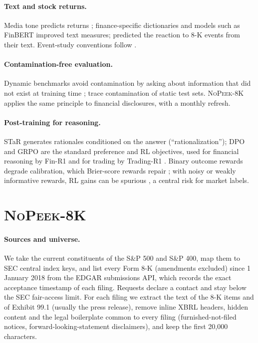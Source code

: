 \documentclass{article}
\newcommand{\dataset}{\textsc{NoPeek-8K}}
\begin{document}
\paragraph{Text and stock returns.}
Media tone predicts returns \citep{tetlock2007giving}; finance-specific dictionaries \citep{loughran2011liability} and
models such as FinBERT \citep{araci2019finbert} improved text measures; \citet{lee2014importance} predicted the
reaction to 8-K events from their text. Event-study conventions follow \citet{mackinlay1997event}.

\paragraph{Contamination-free evaluation.}
Dynamic benchmarks avoid contamination by asking about information that did not exist at training time
\citep{white2024livebench,karger2025forecastbench}; \citet{golchin2024time} trace contamination of static test sets.
\dataset{} applies the same principle to financial disclosures, with a monthly refresh.

\paragraph{Post-training for reasoning.}
STaR \citep{zelikman2022star} generates rationales conditioned on the answer (``rationalization''); DPO
\citep{rafailov2023dpo} and GRPO \citep{shao2024deepseekmath} are the standard preference and RL objectives, used for
financial reasoning by Fin-R1 \citep{liu2025finr1} and for trading by Trading-R1 \citep{xiao2025tradingr1}.
Binary outcome rewards degrade calibration, which Brier-score rewards repair \citep{damani2026beyond}; with noisy or
weakly informative rewards, RL gains can be spurious \citep{shao2026spurious}, a central risk for market labels.

\section{\dataset{}}
\label{sec:data}

\paragraph{Sources and universe.}
We take the current constituents of the S\&P 500 and S\&P 400, map them to SEC central index keys, and list every Form
8-K (amendments excluded) since 1 January 2018 from the EDGAR submissions API, which records the exact acceptance
timestamp of each filing. Requests declare a contact and stay below the SEC fair-access limit.
For each filing we extract the text of the 8-K items and of Exhibit 99.1 (usually the press release), remove inline
XBRL headers, hidden content and the legal boilerplate common to every filing (furnished-not-filed notices,
forward-looking-statement disclaimers), and keep the first 20{,}000 characters.
\end{document}
